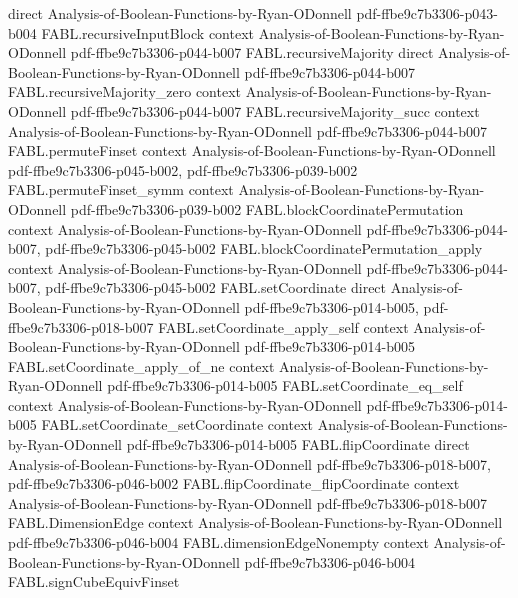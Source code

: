 \begin{theorem}
  {direct}
  {Analysis-of-Boolean-Functions-by-Ryan-ODonnell}
  {pdf-ffbe9c7b3306-p043-b004}
\proofstep
  {FABL.recursiveInputBlock}
  {context}
  {Analysis-of-Boolean-Functions-by-Ryan-ODonnell}
  {pdf-ffbe9c7b3306-p044-b007}
\proofstep
  {FABL.recursiveMajority}
  {direct}
  {Analysis-of-Boolean-Functions-by-Ryan-ODonnell}
  {pdf-ffbe9c7b3306-p044-b007}
\proofstep
  {FABL.recursiveMajority_zero}
  {context}
  {Analysis-of-Boolean-Functions-by-Ryan-ODonnell}
  {pdf-ffbe9c7b3306-p044-b007}
\proofstep
  {FABL.recursiveMajority_succ}
  {context}
  {Analysis-of-Boolean-Functions-by-Ryan-ODonnell}
  {pdf-ffbe9c7b3306-p044-b007}
\proofstep
  {FABL.permuteFinset}
  {context}
  {Analysis-of-Boolean-Functions-by-Ryan-ODonnell}
  {pdf-ffbe9c7b3306-p045-b002,
    pdf-ffbe9c7b3306-p039-b002}
\proofstep
  {FABL.permuteFinset_symm}
  {context}
  {Analysis-of-Boolean-Functions-by-Ryan-ODonnell}
  {pdf-ffbe9c7b3306-p039-b002}
\proofstep
  {FABL.blockCoordinatePermutation}
  {context}
  {Analysis-of-Boolean-Functions-by-Ryan-ODonnell}
  {pdf-ffbe9c7b3306-p044-b007,
    pdf-ffbe9c7b3306-p045-b002}
\proofstep
  {FABL.blockCoordinatePermutation_apply}
  {context}
  {Analysis-of-Boolean-Functions-by-Ryan-ODonnell}
  {pdf-ffbe9c7b3306-p044-b007,
    pdf-ffbe9c7b3306-p045-b002}
\proofstep
  {FABL.setCoordinate}
  {direct}
  {Analysis-of-Boolean-Functions-by-Ryan-ODonnell}
  {pdf-ffbe9c7b3306-p014-b005,
    pdf-ffbe9c7b3306-p018-b007}
\proofstep
  {FABL.setCoordinate_apply_self}
  {context}
  {Analysis-of-Boolean-Functions-by-Ryan-ODonnell}
  {pdf-ffbe9c7b3306-p014-b005}
\proofstep
  {FABL.setCoordinate_apply_of_ne}
  {context}
  {Analysis-of-Boolean-Functions-by-Ryan-ODonnell}
  {pdf-ffbe9c7b3306-p014-b005}
\proofstep
  {FABL.setCoordinate_eq_self}
  {context}
  {Analysis-of-Boolean-Functions-by-Ryan-ODonnell}
  {pdf-ffbe9c7b3306-p014-b005}
\proofstep
  {FABL.setCoordinate_setCoordinate}
  {context}
  {Analysis-of-Boolean-Functions-by-Ryan-ODonnell}
  {pdf-ffbe9c7b3306-p014-b005}
\proofstep
  {FABL.flipCoordinate}
  {direct}
  {Analysis-of-Boolean-Functions-by-Ryan-ODonnell}
  {pdf-ffbe9c7b3306-p018-b007,
    pdf-ffbe9c7b3306-p046-b002}
\proofstep
  {FABL.flipCoordinate_flipCoordinate}
  {context}
  {Analysis-of-Boolean-Functions-by-Ryan-ODonnell}
  {pdf-ffbe9c7b3306-p018-b007}
\proofstep
  {FABL.DimensionEdge}
  {context}
  {Analysis-of-Boolean-Functions-by-Ryan-ODonnell}
  {pdf-ffbe9c7b3306-p046-b004}
\proofstep
  {FABL.dimensionEdgeNonempty}
  {context}
  {Analysis-of-Boolean-Functions-by-Ryan-ODonnell}
  {pdf-ffbe9c7b3306-p046-b004}
\proofstep
  {FABL.signCubeEquivFinset}

\end{theorem}

